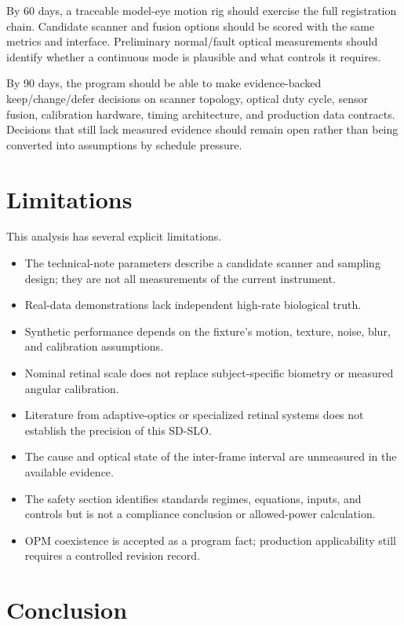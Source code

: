 \documentclass[11pt]{article}
\begin{document}
By 60 days, a traceable model-eye motion rig should exercise the full registration chain. Candidate
scanner and fusion options should be scored with the same metrics and interface. Preliminary
normal/fault optical measurements should identify whether a continuous mode is plausible and what
controls it requires.

By 90 days, the program should be able to make evidence-backed keep/change/defer decisions on
scanner topology, optical duty cycle, sensor fusion, calibration hardware, timing architecture,
and production data contracts. Decisions that still lack measured evidence should remain open
rather than being converted into assumptions by schedule pressure.

\section{Limitations}

This analysis has several explicit limitations.
\begin{itemize}
  \item The technical-note parameters describe a candidate scanner and sampling design; they are
  not all measurements of the current instrument.
  \item Real-data demonstrations lack independent high-rate biological truth.
  \item Synthetic performance depends on the fixture's motion, texture, noise, blur, and
  calibration assumptions.
  \item Nominal retinal scale does not replace subject-specific biometry or measured angular
  calibration.
  \item Literature from adaptive-optics or specialized retinal systems does not establish the
  precision of this SD-SLO.
  \item The cause and optical state of the inter-frame interval are unmeasured in the available
  evidence.
  \item The safety section identifies standards regimes, equations, inputs, and controls but is
  not a compliance conclusion or allowed-power calculation.
  \item OPM coexistence is accepted as a program fact; production applicability still requires a
  controlled revision record.
\end{itemize}

\section{Conclusion}
\end{document}
